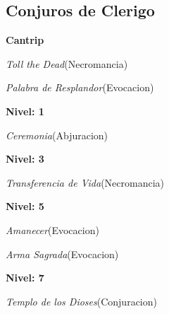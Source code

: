 \documentclass[a4paper,twocolumn,openany,10pt]{dndbook}
\begin{document}
\subsection*{Conjuros de Clerigo}
\begin{list}{}{}
	\item \textbf{Cantrip}
	\begin{list}{}{}
		\item \textit{Toll the Dead}(Necromancia)
		\item \textit{Palabra de Resplandor}(Evocacion)
	\end{list}

	\item \textbf{Nivel: 1}
	\begin{list}{}{}
		\item \textit{Ceremonia}(Abjuracion)
	\end{list}

	\item \textbf{Nivel: 3}
	\begin{list}{}{}
		\item \textit{Transferencia de Vida}(Necromancia)
	\end{list}

	\item \textbf{Nivel: 5}
	\begin{list}{}{}
		\item \textit{Amanecer}(Evocacion)
		\item \textit{Arma Sagrada}(Evocacion)
	\end{list}

	\item \textbf{Nivel: 7}
	\begin{list}{}{}
		\item \textit{Templo de los Dioses}(Conjuracion)
	\end{list}
\end{list}
\end{document}
